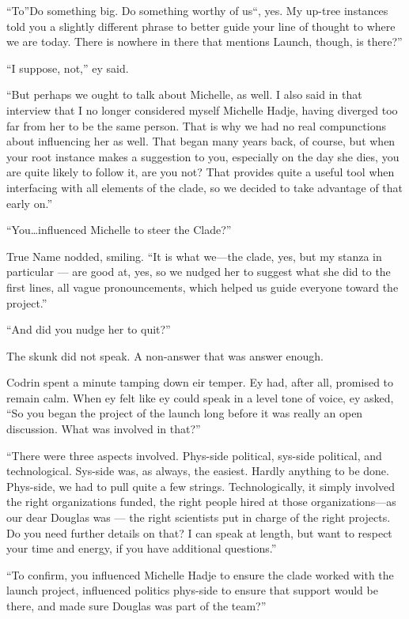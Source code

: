 ``To''Do something big. Do something worthy of us``, yes. My up-tree instances told you a slightly different phrase to better guide your line of thought to where we are today. There is nowhere in there that mentions Launch, though, is there?''

``I suppose, not,'' ey said.

``But perhaps we ought to talk about Michelle, as well. I also said in that interview that I no longer considered myself Michelle Hadje, having diverged too far from her to be the same person. That is why we had no real compunctions about influencing her as well. That began many years back, of course, but when your root instance makes a suggestion to you, especially on the day she dies, you are quite likely to follow it, are you not? That provides quite a useful tool when interfacing with all elements of the clade, so we decided to take advantage of that early on.''

``You\ldots influenced Michelle to steer the Clade?''

True Name nodded, smiling. ``It is what we---the clade, yes, but my stanza in particular — are good at, yes, so we nudged her to suggest what she did to the first lines, all vague pronouncements, which helped us guide everyone toward the project.''

``And did you nudge her to quit?''

The skunk did not speak. A non-answer that was answer enough.

Codrin spent a minute tamping down eir temper. Ey had, after all, promised to remain calm. When ey felt like ey could speak in a level tone of voice, ey asked, ``So you began the project of the launch long before it was really an open discussion. What was involved in that?''

``There were three aspects involved. Phys-side political, sys-side political, and technological. Sys-side was, as always, the easiest. Hardly anything to be done. Phys-side, we had to pull quite a few strings. Technologically, it simply involved the right organizations funded, the right people hired at those organizations---as our dear Douglas was — the right scientists put in charge of the right projects. Do you need further details on that? I can speak at length, but want to respect your time and energy, if you have additional questions.''

``To confirm, you influenced Michelle Hadje to ensure the clade worked with the launch project, influenced politics phys-side to ensure that support would be there, and made sure Douglas was part of the team?''

